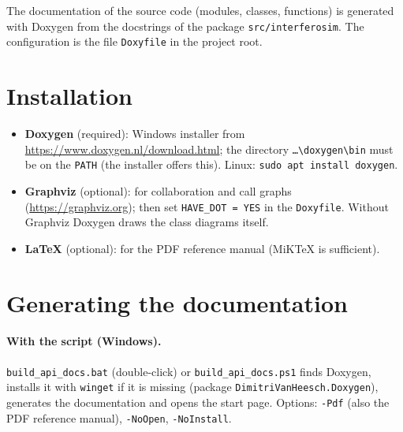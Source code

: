 
The documentation of the source code (modules, classes, functions) is
generated with Doxygen from the docstrings of the package
\texttt{src/interferosim}. The configuration is the file
\texttt{Doxyfile} in the project root.

\section{Installation}

\begin{itemize}
  \item \textbf{Doxygen} (required): Windows installer from
        \url{https://www.doxygen.nl/download.html}; the directory
        \texttt{\ldots\textbackslash doxygen\textbackslash bin} must be on
        the \texttt{PATH} (the installer offers this). Linux:
        \texttt{sudo apt install doxygen}.
  \item \textbf{Graphviz} (optional): for collaboration and call graphs
        (\url{https://graphviz.org}); then set \texttt{HAVE\_DOT = YES}
        in the \texttt{Doxyfile}. Without Graphviz Doxygen draws the
        class diagrams itself.
  \item \textbf{\LaTeX} (optional): for the PDF reference manual
        (MiKTeX is sufficient).
\end{itemize}

\section{Generating the documentation}

\paragraph*{With the script (Windows).} \texttt{build\_api\_docs.bat}
(double-click) or \texttt{build\_api\_docs.ps1} finds Doxygen, installs
it with \texttt{winget} if it is missing (package
\texttt{DimitriVanHeesch.Doxygen}), generates the documentation and opens
the start page. Options: \texttt{-Pdf} (also the PDF reference manual),
\texttt{-NoOpen}, \texttt{-NoInstall}.


